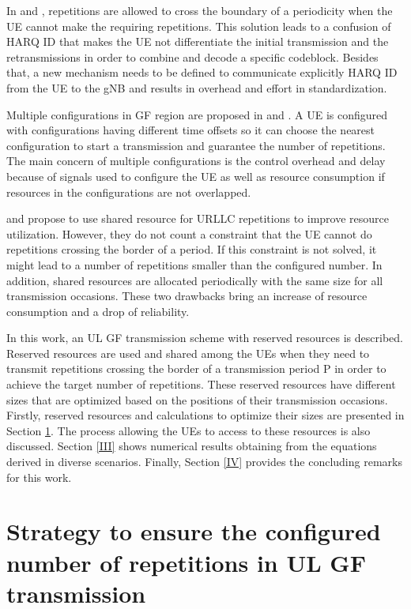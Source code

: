 \documentclass[conference]{IEEEtran}
\begin{document}
In \cite{b1} and \cite{b2}, repetitions are allowed to cross the boundary of a periodicity when the UE cannot make the requiring repetitions. This solution leads to a confusion of HARQ ID that makes the UE not differentiate the initial transmission and the retransmissions in order to combine and decode a specific codeblock. Besides that, a new mechanism needs to be defined to communicate explicitly HARQ ID from the UE to the gNB and results in overhead and effort in standardization.  

Multiple configurations in GF region are proposed in \cite{b3} and \cite{b4}. A UE is configured with configurations having different time offsets so it can choose the nearest configuration to start a transmission and guarantee the number of repetitions. The main concern of multiple configurations is the control overhead and delay because of signals used to configure the UE as well as resource consumption if resources in the configurations are not overlapped.

\cite{b5} and \cite{b7} propose to use shared resource for URLLC repetitions to improve resource utilization. However, they do not count a constraint that the UE cannot do repetitions crossing the border of a period. If this constraint is not solved, it might lead to a number of repetitions smaller than the configured number. In addition, shared resources are allocated periodically with the same size for all transmission occasions. These two drawbacks bring an increase of resource consumption and a drop of reliability.

In this work, an UL GF transmission scheme with reserved resources is described. Reserved resources are used and shared among the UEs when they need to transmit repetitions crossing the border of a transmission period P in order to achieve the target number of repetitions. These reserved resources have different sizes that are optimized based on the positions of their transmission occasions.  
Firstly, reserved resources and calculations to optimize their sizes are presented in Section \ref{II}. The process allowing the UEs to access to these resources is also discussed. Section \ref{III} shows numerical results obtaining from the equations derived in diverse scenarios. Finally, Section \ref{IV} provides the concluding remarks for this work.

\section{Strategy to ensure the configured number of repetitions in UL GF transmission}\label{II}
\end{document}
